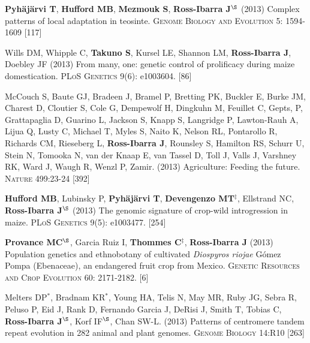 \documentclass[letterpaper,10pt]{article}
\begin{document}
\begin{etaremune}
\item {\bf Pyh\"aj\"arvi T}, {\bf Hufford MB}, {\bf Mezmouk S}, {\bf Ross-Ibarra J}$^\S$ (2013) Complex patterns of local adaptation in teosinte. \textsc{Genome Biology and Evolution} 5: 1594-1609 %
 [117]\\


\item Wills DM, Whipple C, {\bf Takuno S}, Kursel LE, Shannon LM, {\bf Ross-Ibarra J}, Doebley JF (2013) From many, one: genetic control of prolificacy during maize domestication. \textsc{PLoS Genetics} 9(6): e1003604. %
 [86]\\


\item McCouch S, Baute GJ, Bradeen J, Bramel P, Bretting PK, Buckler E, Burke JM, Charest D, Cloutier S, Cole G, Dempewolf H, Dingkuhn M, Feuillet C, Gepts, P, Grattapaglia D, Guarino L, Jackson S, Knapp S, Langridge P, Lawton-Rauh A, Lijua Q, Lusty C, Michael T, Myles S, Naito K, Nelson RL, Pontarollo R, Richards CM, Rieseberg L, {\bf Ross-Ibarra J}, Rounsley S, Hamilton RS, Schurr U, Stein N, Tomooka N, van der Knaap E, van Tassel D, Toll J, Valls J, Varshney RK, Ward J, Waugh R, Wenzl P, Zamir. (2013) Agriculture: Feeding the future. \textsc{Nature} 499:23-24
 [392]\\


\item {\bf Hufford MB}, Lubinsky P, {\bf Pyh\"aj\"arvi T}, {\bf Devengenzo MT}$^\ddagger$, Ellstrand NC, {\bf Ross-Ibarra J}$^\S$ (2013) The genomic signature of crop-wild introgression in maize. \textsc{PLoS Genetics} 9(5): e1003477. %
 [254]\\


\item {\bf Provance MC}$^\S$, Garcia Ruiz I, {\bf Thommes C}$^\ddagger$, {\bf Ross-Ibarra J} (2013) Population genetics and ethnobotany of cultivated \emph{Diospyros riojae} G\'omez Pompa (Ebenaceae), an endangered fruit crop from Mexico. \textsc{Genetic Resources and Crop Evolution} 60: 2171-2182.
 [6]\\


\item Melters DP$^*$, Bradnam KR$^*$, Young HA, Telis N, May MR, Ruby JG, Sebra R, Peluso P, Eid J, Rank D, Fernando Garcia J, DeRisi J, Smith T, Tobias C, {\bf Ross-Ibarra J}$^\S$, Korf IF$^\S$, Chan SW-L. (2013) Patterns of centromere tandem repeat evolution in 282 animal and plant genomes. \textsc{Genome Biology} 14:R10
 [263]\\



\end{etaremune}
\end{document}
